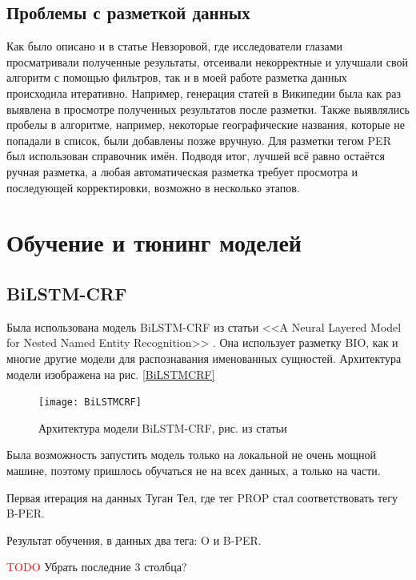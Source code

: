\subsection{Проблемы с разметкой данных}

Как было описано и в статье Невзоровой, где исследователи глазами просматривали полученные результаты, отсеивали некорректные и улучшали свой алгоритм с помощью фильтров, так и в моей работе разметка данных происходила итеративно. Например, генерация статей в Википедии была как раз выявлена в просмотре полученных результатов после разметки. Также выявлялись пробелы в алгоритме, например, некоторые географические названия, которые не попадали в список, были добавлены позже вручную. Для разметки тегом PER был использован справочник имён. Подводя итог, лучшей всё равно остаётся ручная разметка, а любая автоматическая разметка требует просмотра и последующей корректировки, возможно в несколько этапов.

\section{Обучение и тюнинг моделей}

\subsection{BiLSTM-CRF}

Была использована модель BiLSTM-CRF из статьи <<A Neural Layered Model for Nested Named Entity Recognition>> \cite{ju-etal-2018-neural}. Она использует разметку BIO, как и многие другие модели для распознавания именованных сущностей. Архитектура модели изображена на рис. \ref{BiLSTMCRF}

\begin{figure}[H]
\caption{Архитектура модели BiLSTM-CRF, рис. из статьи \cite{ju-etal-2018-neural}}
\texttt{[image: BiLSTMCRF]}
\label{fig:BiLSTMCRF}
\end{figure}


Была возможность запустить модель только на локальной не очень мощной машине, поэтому пришлось обучаться не на всех данных, а только на части.

Первая итерация на данных Туган Тел, где тег PROP стал соответствовать тегу B-PER.

Результат обучения, в данных два тега: O и B-PER.

\textcolor{red}{TODO} Убрать последние 3 столбца?

\medskip

